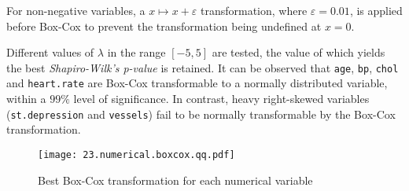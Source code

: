 For non-negative variables, a \( x \mapsto x + \varepsilon \) transformation, where \( \varepsilon = 0.01\), is applied before Box-Cox to prevent the transformation being undefined at \( x = 0 \).

Different values of \( \lambda \) in the range \( [-5, 5] \) are tested, the value of which yields the best \textit{Shapiro-Wilk's p-value} is retained. It can be observed that \texttt{age}, \texttt{bp}, \texttt{chol} and \texttt{heart.rate} are Box-Cox transformable to a normally distributed variable, within a \( 99\% \) level of significance. In contrast, heavy right-skewed variables (\texttt{st.depression} and \texttt{vessels}) fail to be normally transformable by the Box-Cox transformation.

\begin{figure}[h]
    \centering
    \texttt{[image: 23.numerical.boxcox.qq.pdf]}
    \caption{\centering Best Box-Cox transformation for each numerical variable}
\end{figure}

